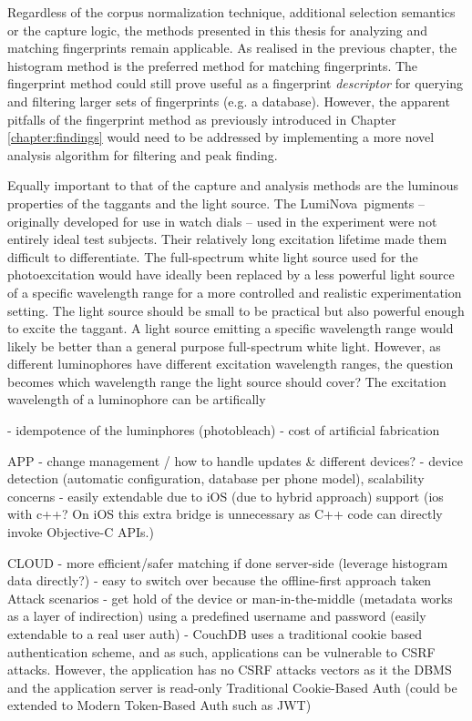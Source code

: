 \documentclass[thesis.tex]{subfiles}
\begin{document}
Regardless of the corpus normalization technique, additional selection semantics or the capture logic, the methods presented in this thesis for analyzing and matching fingerprints remain applicable. As realised in the previous chapter, the histogram method is the preferred method for matching fingerprints. The fingerprint method could still prove useful as a fingerprint \emph{descriptor} for querying and filtering larger sets of fingerprints (e.g. a database). However, the apparent pitfalls of the fingerprint method as previously introduced in Chapter \ref{chapter:findings} would need to be addressed by implementing a more novel analysis algorithm for filtering and peak finding.

Equally important to that of the capture and analysis methods are the luminous properties of the taggants and the light source. The LumiNova\textregistered\ pigments -- originally developed for use in watch dials -- used in the experiment were not entirely ideal test subjects. Their relatively long excitation lifetime made them difficult to differentiate. The full-spectrum white light source used for the photoexcitation would have ideally been replaced by a less powerful light source of a specific wavelength range for a more controlled and realistic experimentation setting. The light source should be small to be practical but also powerful enough to excite the taggant. A light source emitting a specific wavelength range would likely be better than a general purpose full-spectrum white light. However, as different luminophores have different excitation wavelength ranges, the question becomes which wavelength range the light source should cover? The excitation wavelength of a luminophore can be artifically

- idempotence of the luminphores (photobleach)
- cost of artificial fabrication


APP
- change management / how to handle updates \& different devices?
- device detection (automatic configuration, database per phone model), scalability concerns
- easily extendable due to iOS (due to hybrid approach) support (ios with c++? On iOS this extra bridge is unnecessary as C++ code can directly invoke Objective-C APIs.)

CLOUD
- more efficient/safer matching if done server-side (leverage histogram data directly?)
  - easy to switch over because the offline-first approach taken
Attack scenarios
- get hold of the device or man-in-the-middle (metadata works as a layer of indirection)
using a predefined username and password (easily extendable to a real user auth)
- CouchDB uses a traditional cookie based authentication scheme, and as such, applications can be vulnerable to CSRF attacks. However, the application has no CSRF attacks vectors as it the DBMS and the application server is read-only
Traditional Cookie-Based Auth (could be extended to Modern Token-Based Auth such as JWT)
\end{document}
